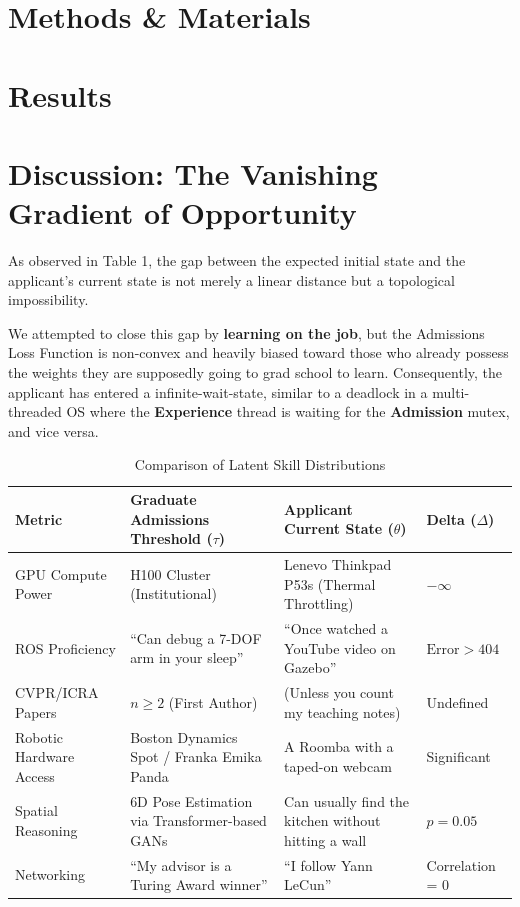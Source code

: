 \documentclass[letterpaper]{article}
\begin{document}
\section{Methods \& Materials}
\vfill

\section{Results}
\vfill

\section{Discussion: The Vanishing Gradient of Opportunity}
As observed in Table 1, the gap between the expected initial state and the applicant’s current state is not merely a linear distance but a topological impossibility.

We attempted to close this gap by \textbf{learning on the job}, but the Admissions Loss Function is non-convex and heavily biased toward those who already possess the weights they are supposedly going to grad school to learn. Consequently, the applicant has entered a infinite-wait-state, similar to a deadlock in a multi-threaded OS where the \textbf{Experience} thread is waiting for the \textbf{Admission} mutex, and vice versa.

\begin{table}[!ht]
\centering
\caption{Comparison of Latent Skill Distributions}
\begin{tabularx}{\textwidth}{l >{\raggedright\arraybackslash}X >{\raggedright\arraybackslash}X >{\raggedright\arraybackslash}X}
\toprule
\textbf{Metric} & \textbf{Graduate Admissions Threshold ($\tau$)} & \textbf{Applicant Current State ($\theta$)} & \textbf{Delta ($\Delta$)} \\
\midrule

GPU Compute Power & H100 Cluster (Institutional) & 2017 Lenevo Thinkpad P53s (Thermal Throttling) & $-\infty$ \\

ROS Proficiency & ``Can debug a 7-DOF arm in your sleep'' & ``Once watched a YouTube video on Gazebo'' & $\text{Error} > 404$ \\

CVPR/ICRA Papers & $n \geq 2$ (First Author) & 0 (Unless you count my teaching notes) & Undefined \\

Robotic Hardware Access & Boston Dynamics Spot / Franka Emika Panda & A Roomba with a taped-on webcam & Significant \\

Spatial Reasoning & 6D Pose Estimation via Transformer-based GANs & Can usually find the kitchen without hitting a wall & $p = 0.05$ \\

Networking & ``My advisor is a Turing Award winner'' & ``I follow Yann LeCun'' & Correlation = 0 \\

\bottomrule
\end{tabularx}
\end{table}
\end{document}
